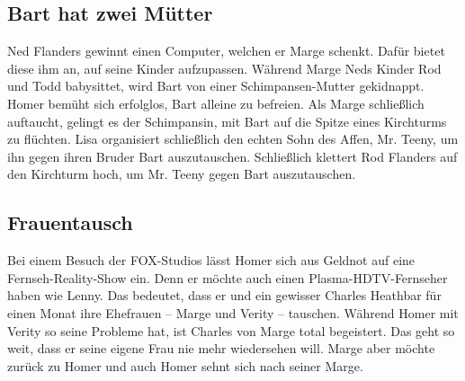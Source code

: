 \subsection{Bart hat zwei Mütter}\label{HABF07}
Ned Flanders gewinnt einen Computer, welchen er Marge schenkt. Dafür bietet diese ihm an, auf seine Kinder aufzupassen. Während Marge Neds Kinder Rod und Todd babysittet, wird Bart von einer Schimpansen-Mutter gekidnappt. Homer bemüht sich erfolglos, Bart alleine zu befreien. Als Marge schließlich auftaucht, gelingt es der Schimpansin, mit Bart auf die Spitze eines Kirchturms zu flüchten. Lisa organisiert schließlich den echten Sohn des Affen, Mr. Teeny, um ihn gegen ihren Bruder Bart auszutauschen. Schließlich klettert Rod Flanders auf den Kirchturm hoch, um Mr. Teeny gegen Bart auszutauschen.


\subsection{Frauentausch}\label{HABF08}
Bei einem Besuch der FOX-Studios lässt Homer sich aus Geldnot auf eine Fernseh-Reality-Show ein. Denn er möchte auch einen Plasma-HDTV-Fernseher haben wie Lenny. Das bedeutet, dass er und ein gewisser Charles Heathbar für einen Monat ihre Ehefrauen -- Marge und Verity -- tauschen. Während Homer mit Verity so seine Probleme hat, ist Charles von Marge total begeistert. Das geht so weit, dass er seine eigene Frau nie mehr wiedersehen will. Marge aber möchte zurück zu Homer und auch Homer sehnt sich nach seiner Marge.

